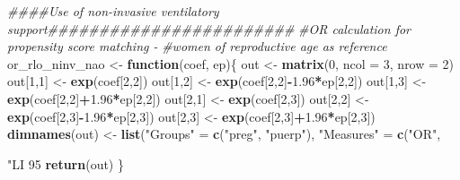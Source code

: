 \documentclass[
]{article}
\newenvironment{Shaded}{\begin{snugshade}}{\end{snugshade}}
\newcommand{\CommentTok}[1]{\textcolor[rgb]{0.56,0.35,0.01}{\textit{#1}}}
\newcommand{\ControlFlowTok}[1]{\textcolor[rgb]{0.13,0.29,0.53}{\textbf{#1}}}
\newcommand{\DataTypeTok}[1]{\textcolor[rgb]{0.13,0.29,0.53}{#1}}
\newcommand{\DecValTok}[1]{\textcolor[rgb]{0.00,0.00,0.81}{#1}}
\newcommand{\FloatTok}[1]{\textcolor[rgb]{0.00,0.00,0.81}{#1}}
\newcommand{\KeywordTok}[1]{\textcolor[rgb]{0.13,0.29,0.53}{\textbf{#1}}}
\newcommand{\NormalTok}[1]{#1}
\newcommand{\OperatorTok}[1]{\textcolor[rgb]{0.81,0.36,0.00}{\textbf{#1}}}
\newcommand{\StringTok}[1]{\textcolor[rgb]{0.31,0.60,0.02}{#1}}
\begin{document}
\begin{Shaded}
\begin{Highlighting}[]
\CommentTok{####Use of non-invasive ventilatory support########################}
\CommentTok{#OR calculation for propensity score matching -}
\CommentTok{#women of reproductive age as reference}
\NormalTok{or_rlo_ninv_nao <-}\StringTok{ }\ControlFlowTok{function}\NormalTok{(coef, ep)\{}
\NormalTok{  out <-}\StringTok{ }\KeywordTok{matrix}\NormalTok{(}\DecValTok{0}\NormalTok{, }\DataTypeTok{ncol =} \DecValTok{3}\NormalTok{, }\DataTypeTok{nrow =} \DecValTok{2}\NormalTok{)}
\NormalTok{  out[}\DecValTok{1}\NormalTok{,}\DecValTok{1}\NormalTok{] <-}\StringTok{ }\KeywordTok{exp}\NormalTok{(coef[}\DecValTok{2}\NormalTok{,}\DecValTok{2}\NormalTok{])}
\NormalTok{  out[}\DecValTok{1}\NormalTok{,}\DecValTok{2}\NormalTok{] <-}\StringTok{ }\KeywordTok{exp}\NormalTok{(coef[}\DecValTok{2}\NormalTok{,}\DecValTok{2}\NormalTok{]}\OperatorTok{-}\FloatTok{1.96}\OperatorTok{*}\NormalTok{ep[}\DecValTok{2}\NormalTok{,}\DecValTok{2}\NormalTok{])}
\NormalTok{  out[}\DecValTok{1}\NormalTok{,}\DecValTok{3}\NormalTok{] <-}\StringTok{ }\KeywordTok{exp}\NormalTok{(coef[}\DecValTok{2}\NormalTok{,}\DecValTok{2}\NormalTok{]}\OperatorTok{+}\FloatTok{1.96}\OperatorTok{*}\NormalTok{ep[}\DecValTok{2}\NormalTok{,}\DecValTok{2}\NormalTok{])  }
\NormalTok{  out[}\DecValTok{2}\NormalTok{,}\DecValTok{1}\NormalTok{] <-}\StringTok{ }\KeywordTok{exp}\NormalTok{(coef[}\DecValTok{2}\NormalTok{,}\DecValTok{3}\NormalTok{])}
\NormalTok{  out[}\DecValTok{2}\NormalTok{,}\DecValTok{2}\NormalTok{] <-}\StringTok{ }\KeywordTok{exp}\NormalTok{(coef[}\DecValTok{2}\NormalTok{,}\DecValTok{3}\NormalTok{]}\OperatorTok{-}\FloatTok{1.96}\OperatorTok{*}\NormalTok{ep[}\DecValTok{2}\NormalTok{,}\DecValTok{3}\NormalTok{])}
\NormalTok{  out[}\DecValTok{2}\NormalTok{,}\DecValTok{3}\NormalTok{] <-}\StringTok{ }\KeywordTok{exp}\NormalTok{(coef[}\DecValTok{2}\NormalTok{,}\DecValTok{3}\NormalTok{]}\OperatorTok{+}\FloatTok{1.96}\OperatorTok{*}\NormalTok{ep[}\DecValTok{2}\NormalTok{,}\DecValTok{3}\NormalTok{]) }
  \KeywordTok{dimnames}\NormalTok{(out) <-}\StringTok{ }\KeywordTok{list}\NormalTok{(}\StringTok{"Groups"}\NormalTok{ =}\StringTok{ }\KeywordTok{c}\NormalTok{(}\StringTok{"preg"}\NormalTok{, }\StringTok{"puerp"}\NormalTok{), }
                        \StringTok{"Measures"}\NormalTok{ =}\StringTok{ }\KeywordTok{c}\NormalTok{(}\StringTok{"OR"}\NormalTok{, }\StringTok{"LI 95%"}\NormalTok{, }\StringTok{"LS 95%"}\NormalTok{))}
  \KeywordTok{return}\NormalTok{(out)}
\NormalTok{\}}

}
\end{Highlighting}
\end{Shaded}
\end{document}
